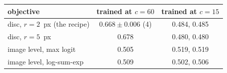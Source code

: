 \begin{tabular}{lcc}
\toprule
objective & trained at $c{=}60$ & trained at $c{=}15$ \\
\midrule
disc, $r=2$~px (the recipe) & $0.668\pm0.006$ (4) & 0.484, 0.485 \\
disc, $r=5$~px & 0.678 & 0.480, 0.480 \\
image level, max logit & 0.505 & 0.519, 0.519 \\
image level, log-sum-exp & 0.509 & 0.502, 0.506 \\
\bottomrule
\end{tabular}
